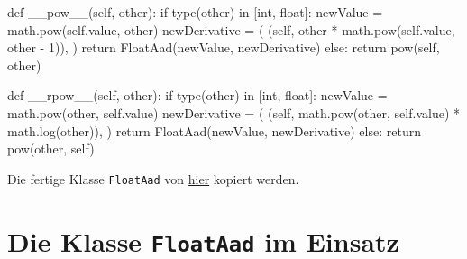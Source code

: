 \documentclass[
  a4paper,
  DIV=11]{scrreprt}
\newenvironment{Shaded}{\begin{snugshade}}{\end{snugshade}}
\newcommand{\BuiltInTok}[1]{\textcolor[rgb]{0.00,0.23,0.31}{#1}}
\newcommand{\ControlFlowTok}[1]{\textcolor[rgb]{0.00,0.23,0.31}{#1}}
\newcommand{\DecValTok}[1]{\textcolor[rgb]{0.68,0.00,0.00}{#1}}
\newcommand{\FunctionTok}[1]{\textcolor[rgb]{0.28,0.35,0.67}{#1}}
\newcommand{\KeywordTok}[1]{\textcolor[rgb]{0.00,0.23,0.31}{#1}}
\newcommand{\NormalTok}[1]{\textcolor[rgb]{0.00,0.23,0.31}{#1}}
\newcommand{\OperatorTok}[1]{\textcolor[rgb]{0.37,0.37,0.37}{#1}}
\newcommand{\VariableTok}[1]{\textcolor[rgb]{0.07,0.07,0.07}{#1}}
\theoremstyle{definition}
\theoremstyle{definition}
\theoremstyle{remark}
\begin{document}
\begin{Shaded}
\begin{Highlighting}[]
\KeywordTok{def} \FunctionTok{\_\_pow\_\_}\NormalTok{(}\VariableTok{self}\NormalTok{, other):}
    \ControlFlowTok{if} \BuiltInTok{type}\NormalTok{(other) }\KeywordTok{in}\NormalTok{ [}\BuiltInTok{int}\NormalTok{, }\BuiltInTok{float}\NormalTok{]:}
\NormalTok{        newValue }\OperatorTok{=}\NormalTok{ math.}\BuiltInTok{pow}\NormalTok{(}\VariableTok{self}\NormalTok{.value, other)}
\NormalTok{        newDerivative }\OperatorTok{=}\NormalTok{ (}
\NormalTok{            (}\VariableTok{self}\NormalTok{, other }\OperatorTok{*}\NormalTok{ math.}\BuiltInTok{pow}\NormalTok{(}\VariableTok{self}\NormalTok{.value, other }\OperatorTok{{-}} \DecValTok{1}\NormalTok{)),}
\NormalTok{        ) }
        \ControlFlowTok{return}\NormalTok{ FloatAad(newValue, newDerivative)           }
    \ControlFlowTok{else}\NormalTok{:}
        \ControlFlowTok{return} \BuiltInTok{pow}\NormalTok{(}\VariableTok{self}\NormalTok{, other)}
    
\KeywordTok{def} \FunctionTok{\_\_rpow\_\_}\NormalTok{(}\VariableTok{self}\NormalTok{, other):}
    \ControlFlowTok{if} \BuiltInTok{type}\NormalTok{(other) }\KeywordTok{in}\NormalTok{ [}\BuiltInTok{int}\NormalTok{, }\BuiltInTok{float}\NormalTok{]:}
\NormalTok{        newValue }\OperatorTok{=}\NormalTok{ math.}\BuiltInTok{pow}\NormalTok{(other, }\VariableTok{self}\NormalTok{.value)}
\NormalTok{        newDerivative }\OperatorTok{=}\NormalTok{ (}
\NormalTok{            (}\VariableTok{self}\NormalTok{, math.}\BuiltInTok{pow}\NormalTok{(other, }\VariableTok{self}\NormalTok{.value) }\OperatorTok{*}\NormalTok{ math.log(other)),}
\NormalTok{        )}
        \ControlFlowTok{return}\NormalTok{ FloatAad(newValue, newDerivative)}
    \ControlFlowTok{else}\NormalTok{:}
        \ControlFlowTok{return} \BuiltInTok{pow}\NormalTok{(other, }\VariableTok{self}\NormalTok{)}
\end{Highlighting}
\end{Shaded}

Die fertige Klasse \texttt{FloatAad} von \href{floataad.py}{hier}
kopiert werden.

\hypertarget{die-klasse-floataad-im-einsatz}{%
\section{\texorpdfstring{Die Klasse \texttt{FloatAad} im
Einsatz}{Die Klasse FloatAad im Einsatz}}\label{die-klasse-floataad-im-einsatz}}
\end{document}
